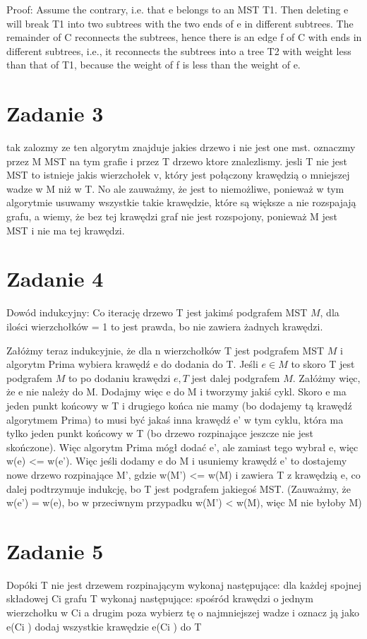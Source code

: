 \documentclass[12pt]{article}
\begin{document}
Proof: Assume the contrary, i.e. that e belongs to an MST T1. Then deleting e will break T1 into two subtrees with the two ends of e in different subtrees. The remainder of C reconnects the subtrees, hence there is an edge f of C with ends in different subtrees, i.e., it reconnects the subtrees into a tree T2 with weight less than that of T1, because the weight of f is less than the weight of e.
\section{Zadanie 3} %
tak
zalozmy ze ten algorytm znajduje jakies drzewo i nie jest one mst. oznaczmy przez M MST na tym grafie i przez T drzewo ktore znalezlismy. jesli T nie jest MST to istnieje jakis wierzchołek v, który jest połączony krawędzią o mniejszej wadze w M niż w T. No ale zauważmy, że jest to niemożliwe, ponieważ w tym algorytmie usuwamy wszystkie takie krawędzie, które są większe a nie rozspajają grafu, a wiemy, że bez tej krawędzi graf nie jest rozspojony, ponieważ M jest MST i nie ma tej krawędzi.
\section{Zadanie 4}%

Dowód indukcyjny:
Co iterację drzewo T jest jakimś podgrafem MST $M$, dla ilości wierzchołków = 1 to jest prawda, bo nie zawiera żadnych krawędzi.

Załóżmy teraz indukcyjnie, że dla n wierzchołków T jest podgrafem MST $M$ i algorytm Prima wybiera krawędź e do dodania do T. Jeśli $e \in M$ to skoro T jest podgrafem $M$ to po dodaniu krawędzi $e, T$ jest dalej podgrafem $M$. 
Załóżmy więc, że e nie należy do M. Dodajmy więc e do M i tworzymy jakiś cykl. Skoro e ma jeden punkt końcowy w T i drugiego końca nie mamy (bo dodajemy tą krawędź algorytmem Prima) to musi być jakaś inna krawędź e' w tym cyklu, która ma tylko jeden punkt końcowy w T (bo drzewo rozpinające jeszcze nie jest skończone). Więc algorytm Prima mógł dodać e', ale zamiast tego wybrał e, więc w(e) <= w(e'). Więc jeśli dodamy e do M i usuniemy krawędź e' to dostajemy nowe drzewo rozpinające M', gdzie w(M') <= w(M) i zawiera T z krawędzią e, co dalej podtrzymuje indukcję, bo T jest podgrafem jakiegoś MST.
(Zauważmy, że w(e') = w(e), bo w przeciwnym przypadku w(M') < w(M), więc M nie byłoby M)
\section{Zadanie 5} %
Dopóki T nie jest drzewem rozpinającym wykonaj następujące:
    dla każdej spojnej składowej Ci grafu T wykonaj następujące:
    spośród krawędzi o jednym wierzchołku w Ci a drugim poza
    wybierz tę o najmniejszej wadze i oznacz ją jako e(Ci )
dodaj wszystkie krawędzie e(Ci ) do T
\end{document}
